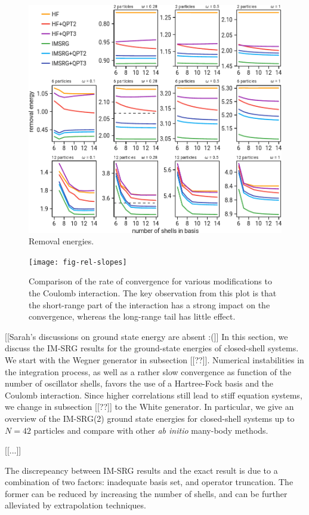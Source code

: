 \begin{figure}
  \centering
  \includegraphics[width=0.8\linewidth]{fig-rm}
  \caption{Removal energies.}
  \label{fig:rm}
\end{figure}

\begin{figure}
  \centering
  \texttt{[image: fig-rel-slopes]}
  \caption{Comparison of the rate of convergence for various modifications to the Coulomb interaction.  The key observation from this plot is that the short-range part of the interaction has a strong impact on the convergence, whereas the long-range tail has little effect.}
  \label{fig:rel-slopes}
\end{figure}

[[Sarah's discussions on ground state energy are absent :(]]
In this section, we discuss the IM-SRG results for the ground-state energies of closed-shell systems.  We start with the Wegner generator in subsection [[??]].  Numerical instabilities in the integration process, as well as a rather slow convergence as function of the number of oscillator shells, favors the use of a Hartree-Fock basis and the Coulomb interaction.  Since higher correlations still lead to stiff equation systems, we change in subsection [[??]] to the White generator. In particular, we give an overview of the IM-SRG(2) ground state energies for closed-shell systems up to $N=42$ particles and compare with other \textit{ab initio} many-body methods.

[[...]]


The discrepeancy between IM-SRG results and the exact result is due to a combination of two factors: inadequate basis set, and operator truncation.
The former can be reduced by increasing the number of shells, and can be further alleviated by extrapolation techniques.

